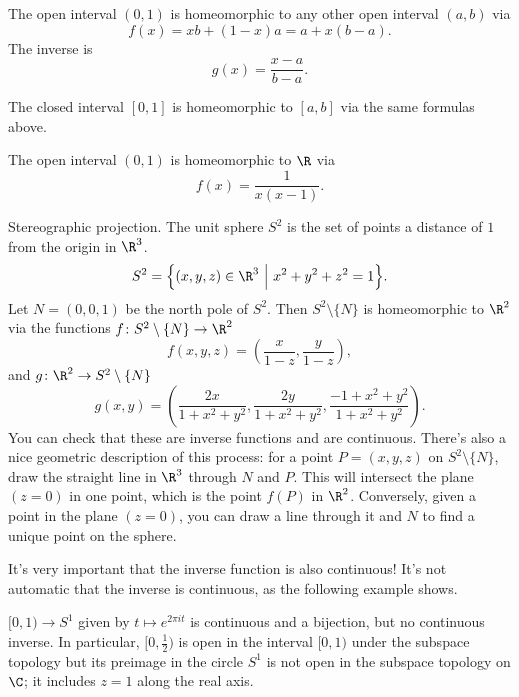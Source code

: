 \documentclass[noname]{notes}
\begin{document}
\begin{example}
	The open interval $(0,1)$ is homeomorphic to any other open interval $(a,b)$ via 
	\[
		f(x) = xb + (1-x)a = a + x(b-a). 
	\]
	The inverse is 
	\[
		g(x) = \frac{x-a}{b-a}.
	\]
\end{example}

\begin{example}
	The closed interval $[0,1]$ is homeomorphic to $[a,b]$ via the same formulas above.
\end{example}

\begin{example}
	The open interval $(0,1)$ is homeomorphic to $\R$ via 
	\[
		f(x) = \frac{1}{x(x-1)}. 
	\]
\end{example}

\begin{example}
	Stereographic projection. The unit sphere $S^2$ is the set of points a distance of $1$ from the origin in $\R^3$. 
	\[
		S^2 = \Big\{ (x,y,z) \in \R^3 \ \Big\vert\ x^2 + y^2 + z^2 = 1\Big\}. 
	\]
	Let $N = (0,0,1)$ be the north pole of $S^2$. Then $S^2 \setminus \{N\}$ is homeomorphic to $\R^2$ via the functions $f \colon S^2 \setminus \{N\} \to \R^2$  
	\[
		f(x,y,z) = \left(\frac{x}{1-z}, \frac{y}{1-z}\right),
	\]
	and $g \colon \R^2 \to S^2 \setminus \{N\}$ 
	\[
		g(x,y) = \left(\frac{2x}{1 + x^2 + y^2}, \frac{2y}{1 + x^2 + y^2}, \frac{-1 + x^2 + y^2}{1 + x^2 + y^2} \right).
	\]
	You can check that these are inverse functions and are continuous. There's also a nice geometric description of this process: for a point $P = (x,y,z)$ on $S^2 \setminus \{N\}$, draw the straight line in $\R^3$ through $N$ and $P$. This will intersect the plane $(z = 0)$ in one point, which is the point $f(P)$ in $\R^2$. Conversely, given a point in the plane $(z = 0)$, you can draw a line through it and $N$ to find a unique point on the sphere. 
\end{example}

It's very important that the inverse function is also continuous! It's not automatic that the inverse is continuous, as the following example shows. 

\begin{example}
	$[0,1) \to S^1$ given by $t \mapsto e^{2 \pi i t}$ is continuous and a bijection, but no continuous inverse. In particular, $[0,\frac{1}{2})$ is open in the interval $[0,1)$ under the subspace topology but its preimage in the circle $S^1$ is not open in the subspace topology on $\C$; it includes $z = 1$ along the real axis.
\end{example}
\end{document}
